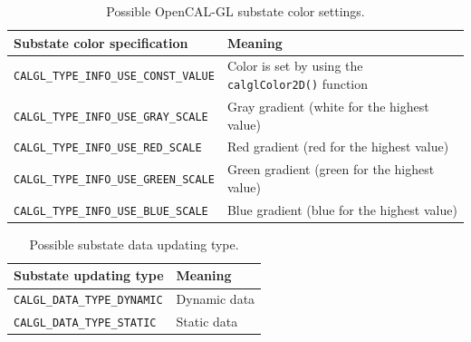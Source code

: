 \begin{table}
  \centering
  \footnotesize
  \begin{tabular}{l|l}
    \hline
    Substate color specification & Meaning \\
    \hline
    \hline
    \verb'CALGL_TYPE_INFO_USE_CONST_VALUE' & Color is set by using the \verb'calglColor2D()' function\\
    \verb'CALGL_TYPE_INFO_USE_GRAY_SCALE'  & Gray gradient (white for the highest value)\\
    \verb'CALGL_TYPE_INFO_USE_RED_SCALE '  & Red gradient (red for the highest value)\\
    \verb'CALGL_TYPE_INFO_USE_GREEN_SCALE' & Green gradient (green for the highest value)\\
    \verb'CALGL_TYPE_INFO_USE_BLUE_SCALE'  & Blue gradient (blue for the highest value)\\
    \hline
  \end{tabular}
  \caption{Possible OpenCAL-GL substate color settings.}
  \label{tab:substate_color_info}
\end{table}

\begin{table}
  \centering
  \small
  \begin{tabular}{l|l}
    \hline
    Substate updating type & Meaning \\
    \hline
    \hline
    \verb'CALGL_DATA_TYPE_DYNAMIC' & Dynamic data\\
    \verb'CALGL_DATA_TYPE_STATIC'  & Static data\\
    \hline
  \end{tabular}
  \caption{Possible substate data updating type.}
  \label{tab:substate_updating_type}
\end{table}

